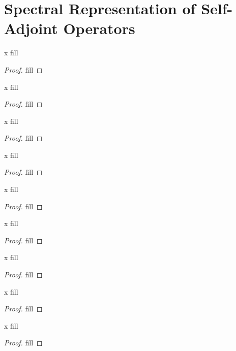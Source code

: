 \section{Spectral Representation of Self-Adjoint Operators}


\begin{exercise}{x}
fill
\end{exercise}
\begin{proof}
fill
\end{proof} 

\begin{exercise}{x}
fill
\end{exercise}
\begin{proof}
fill
\end{proof} 

\begin{exercise}{x}
fill
\end{exercise}
\begin{proof}
fill
\end{proof} 

\begin{exercise}{x}
fill
\end{exercise}
\begin{proof}
fill
\end{proof} 

\begin{exercise}{x}
fill
\end{exercise}
\begin{proof}
fill
\end{proof} 

\begin{exercise}{x}
fill
\end{exercise}
\begin{proof}
fill
\end{proof} 

\begin{exercise}{x}
fill
\end{exercise}
\begin{proof}
fill
\end{proof} 

\begin{exercise}{x}
fill
\end{exercise}
\begin{proof}
fill
\end{proof} 

\begin{exercise}{x}
fill
\end{exercise}
\begin{proof}
fill
\end{proof} 

